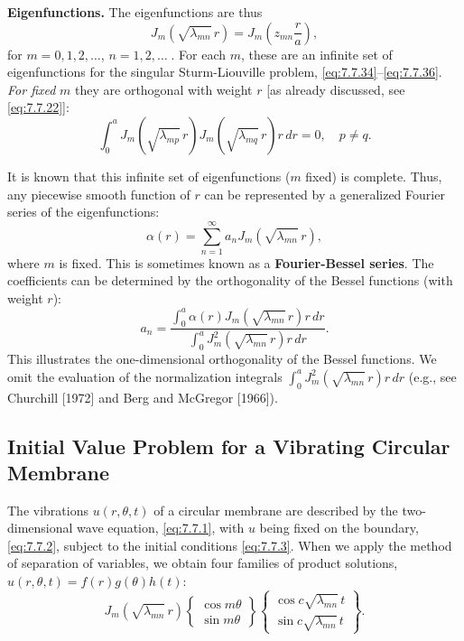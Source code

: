 \textbf{Eigenfunctions.}  The eigenfunctions are thus
\begin{equation}
J_m\left(\sqrt{\lambda_{mn}}\,r\right) = J_m\left(z_{mn}\frac{r}{a}\right),
\label{eq:7.7.41}
\end{equation}
for $m = 0, 1, 2, \ldots$, $n = 1, 2, \ldots\;$.  For each $m$, these are an infinite set of eigenfunctions for the singular Sturm-Liouville problem, \eqref{eq:7.7.34}--\eqref{eq:7.7.36}.  \emph{For fixed} $m$ they are orthogonal with weight $r$ [as already discussed, see \eqref{eq:7.7.22}]:
\begin{equation}
\int_0^a J_m\left(\sqrt{\lambda_{mp}}\,r\right)J_m\left(\sqrt{\lambda_{mq}}\,r\right)r\,dr = 0, \quad p \neq q.
\label{eq:7.7.42}
\end{equation}

It is known that this infinite set of eigenfunctions ($m$ fixed) is complete.  Thus, any piecewise smooth function of $r$ can be represented by a generalized Fourier series of the eigenfunctions:
\begin{equation}
\alpha(r) = \sum_{n=1}^{\infty} a_n J_m\left(\sqrt{\lambda_{mn}}\,r\right),
\label{eq:7.7.43}
\end{equation}
where $m$ is fixed.  This is sometimes known as a \textbf{Fourier-Bessel series}.  The coefficients can be determined by the orthogonality of the Bessel functions (with weight $r$):
\begin{equation}
a_n = \frac{\int_0^a \alpha(r)J_m\left(\sqrt{\lambda_{mn}}\,r\right)r\,dr}{\int_0^a J_m^2\left(\sqrt{\lambda_{mn}}\,r\right)r\,dr}.
\label{eq:7.7.44}
\end{equation}
This illustrates the one-dimensional orthogonality of the Bessel functions.  We omit the evaluation of the normalization integrals $\int_0^a J_m^2\left(\sqrt{\lambda_{mn}}\,r\right)r\,dr$ (e.g., see Churchill [1972] and Berg and McGregor [1966]).

\subsection{Initial Value Problem for a Vibrating Circular Membrane}
\label{sec:7.7.8}

The vibrations $u(r,\theta,t)$ of a circular membrane are described by the two-dimensional wave equation, \eqref{eq:7.7.1}, with $u$ being fixed on the boundary, \eqref{eq:7.7.2}, subject to the initial conditions \eqref{eq:7.7.3}.  When we apply the method of separation of variables, we obtain four families of product solutions, $u(r,\theta,t) = f(r)g(\theta)h(t)$:
\begin{equation}
J_m\left(\sqrt{\lambda_{mn}}\,r\right)
\begin{Bmatrix} \cos m\theta \\ \sin m\theta \end{Bmatrix}
\begin{Bmatrix} \cos c\sqrt{\lambda_{mn}}\,t \\ \sin c\sqrt{\lambda_{mn}}\,t \end{Bmatrix}.
\label{eq:7.7.45}
\end{equation}

